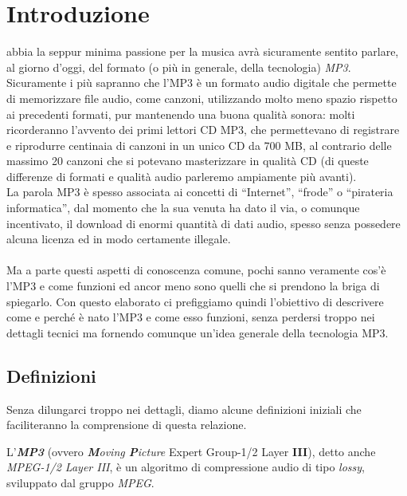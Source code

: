 \chapter{Introduzione} \label{chap:introduzione}
	
	 abbia la seppur minima passione per la musica avrà sicuramente sentito parlare, al giorno d'oggi, del formato (o più in generale, della tecnologia) \textit{MP3}. Sicuramente i più sapranno che l'MP3 è un formato audio digitale che permette di memorizzare file audio, come canzoni, utilizzando molto meno spazio rispetto ai precedenti formati, pur mantenendo una buona qualità sonora: molti ricorderanno l'avvento dei primi lettori CD MP3, che permettevano di registrare e riprodurre centinaia di canzoni in un unico CD da 700 MB, al contrario delle massimo 20 canzoni che si potevano masterizzare in qualità CD (di queste differenze di formati e qualità audio parleremo ampiamente più avanti).\\
	La parola MP3 è spesso associata ai concetti di ``Internet'', ``frode'' o ``pirateria informatica'', dal momento che la sua venuta ha dato il via, o comunque incentivato, il download di enormi quantità di dati audio, spesso senza possedere alcuna licenza ed in modo certamente illegale.\\
	\\
	Ma a parte questi aspetti di conoscenza comune, pochi sanno veramente cos'è l'MP3 e come funzioni ed ancor meno sono quelli che si prendono la briga di spiegarlo. Con questo elaborato ci prefiggiamo quindi l'obiettivo di descrivere come e perché è nato l'MP3 e come esso funzioni, senza perdersi troppo nei dettagli tecnici ma fornendo comunque un'idea generale della tecnologia MP3.
	
	\section{Definizioni} \label{sec:definizioni}
		Senza dilungarci troppo nei dettagli, diamo alcune definizioni iniziali che faciliteranno la comprensione di questa relazione.
		
		\begin{defi} \label{defi:mp3}
			L'\emph{\textbf{MP3}} (ovvero \emph{\textbf{M}oving \textbf{P}icture} Expert Group-1/2 Layer \textbf{III}), detto anche \emph{MPEG-1/2 Layer III}, è un algoritmo di compressione audio di tipo \emph{lossy}, sviluppato dal gruppo \emph{MPEG}.
		\end{defi}
		
